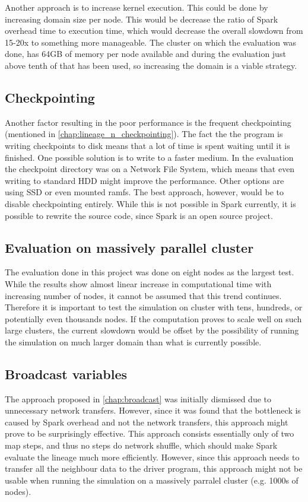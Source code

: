 \documentclass{l4proj}
\begin{document}
Another approach is to increase kernel execution. This could be done by increasing
domain size per node. This would be decrease the ratio of Spark overhead time to 
execution time, which would decrease the overall slowdown from 15-20x to 
something more manageable. The cluster on which the evaluation was done, has 64GB
of memory per node available and during the evaluation just above tenth of that
has been used, so increasing the domain is a viable strategy.

\subsection{Checkpointing}

Another factor resulting in the poor performance is the frequent checkpointing
(mentioned in \autoref{chap:lineage_n_checkpointing}). The fact the the program
is writing checkpoints to disk means that a lot of time is spent waiting until
it is finished. One possible solution is to write to a faster medium. In the evaluation
the checkpoint directory was on a Network File System, which means that even 
writing to standard HDD might improve the performance. Other options are using SSD
or even mounted ramfs. The best approach, however, would be to disable checkpointing
entirely. While this is not possible in Spark currently, it is possible to rewrite 
the source code, since Spark is an open source project.

\subsection{Evaluation on massively parallel cluster}

The evaluation done in this project was done on eight nodes as the largest test.
While the results show almost linear increase in computational time with
increasing number of nodes, it cannot be assumed that this trend continues.
Therefore it is important to test the simulation on cluster with tens, hundreds,
or potentially even thousands nodes. If the computation proves to scale well
on such large clusters, the current slowdown would be offset by the 
possibility of running the simulation on much larger domain than what is
currently possible.

\subsection{Broadcast variables}
The approach proposed in \autoref{chap:broadcast} was initially dismissed due to 
unnecessary network transfers. However, since it was found that the bottleneck 
is caused by Spark overhead and not the network transfers, this approach
might prove to be surprisingly effective. This approach consists essentially only 
of two map steps, and thus no steps do network shuffle, which should make Spark
evaluate the lineage much more efficiently. However, since this approach needs
to transfer all the neighbour data to the driver program, this approach might
not be usable when running the simulation on a massively parralel cluster (e.g. 1000s of nodes).
\end{document}
